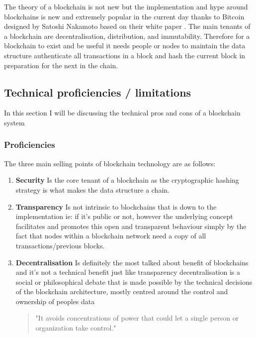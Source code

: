 \documentclass[12pt]{report}
\begin{document}
The theory of a blockchain is not new \cite{origins_blockchain} but the implementation and hype around blockchains is new and extremely popular in the current day thanks to Bitcoin designed by Satoshi Nakamoto based on their white paper \cite{nakamoto2008bitcoin}. The main tenants of a blockchain are decentralisation, distribution, and immutability. Therefore for a blockchain to exist and be useful it needs people or nodes to maintain the data structure authenticate all transactions in a block and hash the current block in preparation for the next in the chain.


\subsection{Technical proficiencies / limitations}

In this section I will be discussing the technical pros and cons of a blockchain system

\subsubsection{Proficiencies}

The three main selling points of blockchain technology are as follows:

\begin{enumerate}
	\item \textbf{Security} Is the core tenant of a blockchain as the cryptographic hashing strategy is what makes the data structure a chain.
	\item \textbf{Transparency} Is not intrinsic to blockchains that is down to the implementation ie: if it's public or not, however the underlying concept facilitates and promotes this open and transparent behaviour simply by the fact that nodes within a blockchain network need a copy of all transactions/previous blocks.
	\item \textbf{Decentralisation} Is definitely the most talked about benefit of blockchains and it's not a technical benefit just like transparency decentralisation is a social or philosophical debate that is made possible by the technical decisions of the blockchain architecture, mostly centred around the control and ownership of peoples data \begin{quote}"It avoids concentrations of power that could let a single person or organization take control."\cite{bohme2015bitcoin}\end{quote} 
\end{enumerate}
\end{document}
